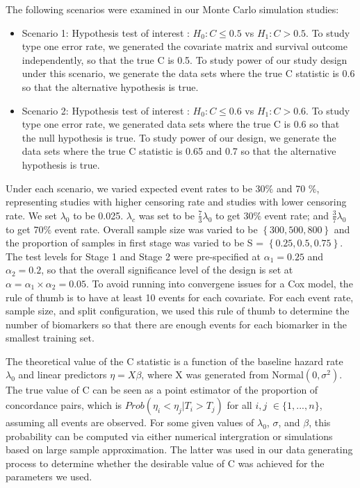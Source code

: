 \documentclass[11pt]{article}
\begin{document}
	\par The following scenarios were examined in our Monte Carlo simulation studies:
	\begin{itemize}
		\item Scenario 1: Hypothesis test of interest : $H_0: C \leq 0.5$ vs $H_1: C > 0.5 $.  To study type one error rate, we generated the covariate matrix and survival outcome independently, so that the true C is 0.5. To study power of our study design under this scenario, we generate the data sets where the true C statistic is 0.6 so that the alternative hypothesis is true. 
		\item Scenario 2: Hypothesis test of interest : $H_0: C \leq 0.6$ vs $H_1: C > 0.6 $. To study type one error rate, we generated data sets where the true C is 0.6 so that the null hypothesis is true. To study power of our design, we generate the data sets where the true C statistic is 0.65 and 0.7 so that the alternative hypothesis is true. 
	\end{itemize}

	\par Under each scenario, we varied expected event rates to be 30$\%$ and 70 $\%$, representing studies with higher censoring rate and studies with lower censoring rate. We set $\lambda_0$ to be 0.025. $\lambda_c$ was set to be $\frac{7}{3}\lambda_0$ to get 30$\%$ event rate; and $\frac{3}{7}\lambda_0$ to get 70$\%$ event rate. Overall sample size was varied to be $\left\{ 300, 500, 800 \right\}$ and the proportion of samples in first stage was varied to be S = $\left\{ 0.25, 0.5 , 0.75 \right\}$. The test levels for Stage 1 and Stage 2 were pre-specified at $\alpha_1 = 0.25$ and $\alpha_2 = 0.2$, so that the overall significance level of the design is set at $\alpha = \alpha_1 \times \alpha_2 = 0.05$. To avoid running into convergene issues for a Cox model, the rule of thumb is to have at least 10 events for each covariate. For each event rate, sample size, and split configuration, we used this rule of thumb to determine the number of biomarkers so that there are enough events for each biomarker in the smallest training set. 

	\par  The theoretical value of the C statistic is a function of the baseline hazard rate $\lambda_0$ and linear predictors $\eta = X\beta$, where X was generated from Normal$(0, \sigma^2)$. The true value of C can be seen as a point estimator of the proportion of concordance pairs, which is $Prob(\eta_{i} < \eta_{j} | T_{i} > T_{j})$ for all $i,j$ $\in \{1, ... , n \}$, assuming all events are observed. For some given values of $\lambda_0$, $\sigma$, and $\beta$, this probability can be computed via either numerical intergration or simulations based on large sample approximation. The latter was used in our data generating process to determine whether the desirable value of C was achieved for the parameters we used. 
\end{document}
